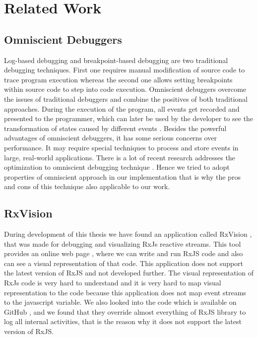 \section{Related Work}

\subsection{Omniscient Debuggers}
Log-based debugging and breakpoint-based debugging are two traditional debugging techniques. First one requires manual modification of source code to trace program execution whereas the second one allows setting breakpoints within source code to step into code execution. Omniscient debuggers overcome the issues of traditional debuggers and combine the positives of both traditional approaches. During the execution of the program, all events get recorded and presented to the programmer, which can later be used by the developer to see the transformation of states caused by different events \citep{Pothier:2007:SOD:1297105.1297067}.
Besides the powerful advantages of omniscient debuggers, it has some serious concerns over performance. It may require special techniques to process and store events in large, real-world applications. There is a lot of recent research addresses the optimization to omniscient debugging technique  \citep{Pothier:2007:SOD:1297105.1297067,Pothier2011,Lienhard2008}.
Hence we tried to adopt properties of omniscient approach in our implementation that is why the pros and cons of this technique also applicable to our work.

\subsection{RxVision}
During development of this thesis we have found an application called RxVision \cite{GithubRxvision}, that was made for debugging and visualizing RxJs reactive streams. This tool provides an online web page \citep{PlaygroundRxvision}, where we can write and run RxJS code and also can see a visual representation of that code. This application does not support the latest version of RxJS and not developed further. The visual representation of RxJs code is very hard to understand and it is very hard to map visual representation to the code because this application does not map event streams to the javascript variable. We also looked into the code which is available on GitHub \cite{GithubRxvision}, and we found that they override almost everything of RxJS library to log all internal activities, that is the reason why it does not support the latest version of RxJS.

